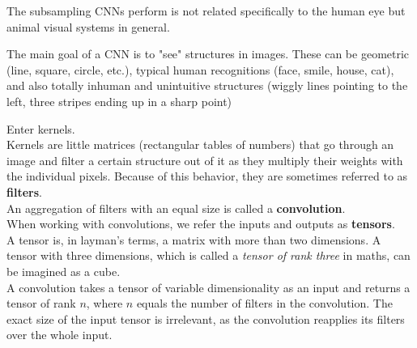 The subsampling CNNs perform is not related specifically to the human eye but animal visual systems in general.  \cite{MasakazuMatsugu2003}  

The main goal of a CNN is to "see" structures in images.  
These can be geometric (line, square, circle, etc.),  
typical human recognitions (face, smile, house, cat),  
and also totally inhuman and unintuitive structures (wiggly lines pointing to the left, three stripes ending up in a sharp point)

Enter kernels.  \\
Kernels are little matrices (rectangular tables of numbers) that go through an image and filter a certain structure out of it as they multiply their weights with the individual pixels. Because of this behavior, they are sometimes referred to as \textbf{filters}. \\

An aggregation of filters with an equal size is called a \textbf{convolution}. \\
When working with convolutions, we refer the inputs and outputs as \textbf{tensors}.\\
A tensor is, in layman's terms, a matrix with more than two dimensions. A tensor with three dimensions, which is called a \emph{tensor of rank three} in maths, can be imagined as a cube.\\
A convolution takes a tensor of variable dimensionality as an input and returns a tensor of rank $n$, where $n$ equals the number of filters in the convolution. The exact size of the input tensor is irrelevant, as the convolution reapplies its filters over the whole input.